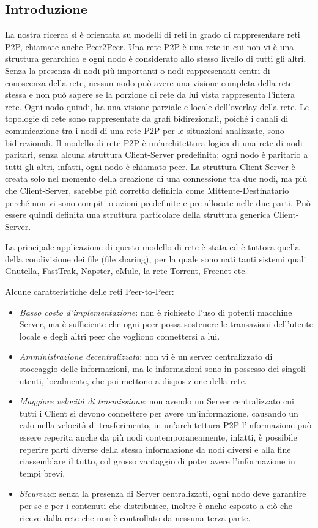 \subsection{Introduzione}
La nostra ricerca si è orientata su modelli di reti in grado di rappresentare reti \acf{P2P}, chiamate anche Peer2Peer. Una rete P2P è una rete in cui non vi è una struttura gerarchica e ogni nodo è considerato allo stesso livello di tutti gli altri. Senza la presenza di nodi più importanti o nodi rappresentati centri di conoscenza della rete, nessun nodo può avere una visione completa della rete stessa e non può sapere se la porzione di rete da lui vista rappresenta l'intera rete. Ogni nodo quindi, ha una visione parziale e locale dell'overlay della rete. Le topologie di rete sono rappresentate da grafi bidirezionali, poiché i canali di comunicazione tra i nodi di una rete P2P per le situazioni analizzate, sono bidirezionali. Il modello di rete P2P\cite{peertopeer-book} è un'architettura logica di una rete di nodi paritari, senza alcuna struttura Client-Server predefinita; ogni nodo è paritario a tutti gli altri, infatti, ogni nodo è chiamato peer. La struttura Client-Server è creata solo nel momento della creazione di una connessione tra due nodi, ma più che Client-Server, sarebbe più corretto definirla come Mittente-Destinatario perché non vi sono compiti o azioni predefinite e pre-allocate nelle due parti. Può essere quindi definita una struttura particolare della struttura generica Client-Server.

La principale applicazione di questo modello di rete è stata ed è tuttora quella della condivisione dei file (file sharing), per la quale sono nati tanti sistemi quali Gnutella, FastTrak, Napster, eMule, la rete Torrent, Freenet etc.

Alcune caratteristiche delle reti Peer-to-Peer:
\begin{itemize}
	\item \textit{Basso costo d'implementazione}: non è richiesto l'uso di potenti macchine Server, ma è sufficiente che ogni peer possa sostenere le transazioni dell'utente locale e degli altri peer che vogliono connettersi a lui.
	\item \textit{Amministrazione decentralizzata}: non vi è un server centralizzato di stoccaggio delle informazioni, ma le informazioni sono in possesso dei singoli utenti, localmente, che poi mettono a disposizione della rete.
	\item \textit{Maggiore velocità di trasmissione}: non avendo un Server centralizzato cui tutti i Client si devono connettere per avere un'informazione, causando un calo nella velocità di trasferimento, in un'architettura \acs{P2P} l'informazione può essere reperita anche da più nodi contemporaneamente, infatti, è possibile reperire parti diverse della stessa informazione da nodi diversi e alla fine riassemblare il tutto, col grosso vantaggio di poter avere l'informazione in tempi brevi.
	\item \textit{Sicurezza}: senza la presenza di Server centralizzati, ogni nodo deve garantire per se e per i contenuti che distribuisce, inoltre è anche esposto a ciò che riceve dalla rete che non è controllato da nessuna terza parte. 
\end{itemize}

